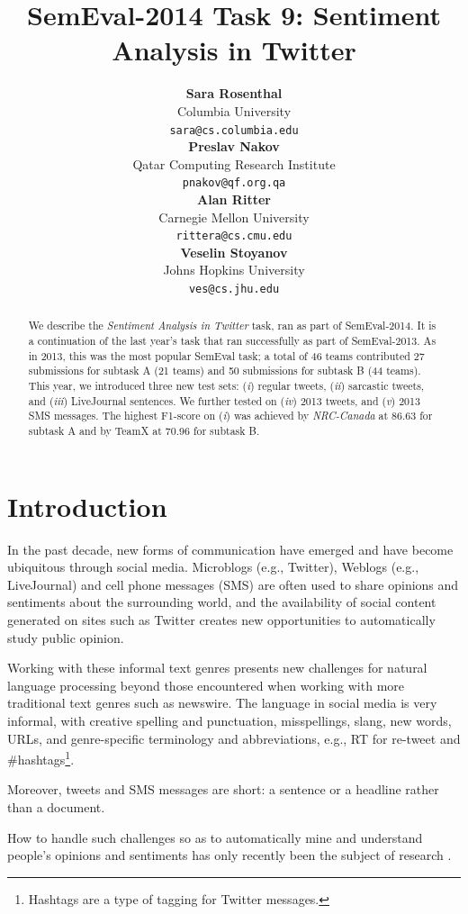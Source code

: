 \documentclass[11pt]{article}
\title{SemEval-2014 Task 9: Sentiment Analysis in Twitter}
\author{
{\bf Sara Rosenthal }\\Columbia University\\{\small {\tt sara@cs.columbia.edu}}\\
{\bf Preslav Nakov}\\Qatar Computing Research Institute\\{\small {\tt pnakov@qf.org.qa}}\\
\And
{\bf Alan Ritter}\\Carnegie Mellon University\\{\small {\tt rittera@cs.cmu.edu}}\\
{\bf Veselin Stoyanov}\\Johns Hopkins University\\{\small {\tt ves@cs.jhu.edu}}\\
}
\date{}
\begin{document}
\maketitle
\begin{abstract}
We describe the \emph{Sentiment Analysis in Twitter} task, ran as part of SemEval-2014. It is a continuation of the last year's task that ran successfully as part of SemEval-2013. As in 2013, this was the most popular SemEval task; a total of 46 teams contributed 27 submissions for subtask A (21 teams) and 50 submissions for subtask B (44 teams). This year, we introduced three new test sets: (\emph{i}) regular tweets, (\emph{ii}) sarcastic tweets, and (\emph{iii}) LiveJournal sentences. We further tested on (\emph{iv}) 2013 tweets, and (\emph{v}) 2013 SMS messages.
The highest F1-score on (\emph{i}) was achieved by \emph{NRC-Canada} at 86.63 for subtask A and by TeamX at 70.96 for subtask B.
\end{abstract}

\section{Introduction}

In the past decade, new forms of communication have emerged and have become ubiquitous through social media.  Microblogs (e.g., Twitter), Weblogs (e.g., LiveJournal) and cell phone messages (SMS) are often used to share opinions and sentiments about the surrounding world, and the availability of social content generated on sites such as Twitter creates new opportunities to automatically study public opinion.

Working with these informal text genres presents new challenges for natural language processing
beyond those encountered when working with more traditional text genres such as newswire.
The language in social media is very informal, with creative spelling and punctuation, misspellings, slang, new words, URLs, and genre-specific terminology and abbreviations, e.g., RT for re-tweet and \#hashtags\footnote{Hashtags are a type of tagging for Twitter messages.}.

Moreover, tweets and SMS messages are short: a sentence or a headline rather than a document.

How to handle such challenges so as to automatically mine and understand people's opinions and sentiments
has only recently been the subject of research \cite{Jansen09,Barbosa10,Bifet11,Davidov10,oconnor10,Pak10,Tumasjan10,Kouloumpis11}.
\end{document}
